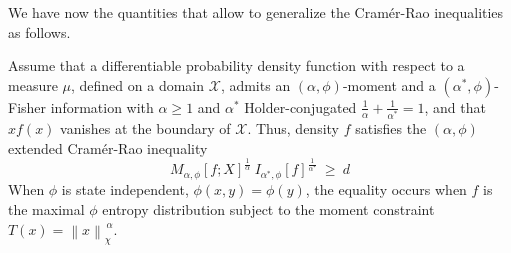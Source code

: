 \documentclass[entropy,article,submit,moreauthors,pdftex]{Definitions/mdpi}
\def\X{\mathcal{X}}%
\begin{document}
We  have  now   the  quantities  that  allow  to   generalize  the  Cram\'er-Rao
inequalities as follows.
%
\begin{Proposition}
\label{prop:np-phi-CR}
%
  Assume that  a differentiable probability  density function with respect  to a
  measure $\mu$, defined on a  domain $\X$, admits an $(\alpha,\phi)$-moment and
  a  $(\alpha^*,\phi)$-Fisher information  with  $\alpha \ge  1$ and  $\alpha^*$
  Holder-conjugated  $\frac{1}{\alpha} +  \frac{1}{\alpha^*} =  1$, and  that $x
  f(x)$  vanishes at  the boundary  of $\X$.   Thus, density  $f$ satisfies  the
  $(\alpha,\phi)$ extended Cram\'er-Rao inequality
  \begin{equation}\label{eq:np-phi-CR}
   M_{\alpha,\phi}[f;X]^{\frac{1}{\alpha}} \: I_{\alpha^*\!,\phi}[f]^{\frac{1}{\alpha^*}}
   \: \ge \: d
  \end{equation}
  When $\phi$ is  state independent, $\phi(x,y) = \phi(y)$,  the equality occurs
  when $f$  is the  maximal $\phi$  entropy distribution  subject to  the moment
  constraint $T(x) = \left\| x \right\|_{\chi}^{\, \alpha}$.
\end{Proposition}
\end{document}
